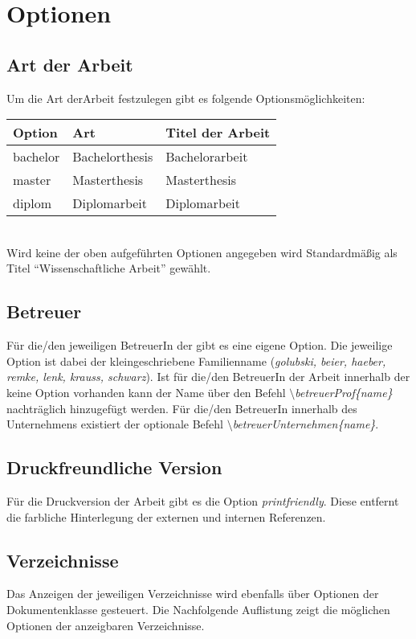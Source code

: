 \section{Optionen}
\label{sec:class_opts}

\subsection{Art der Arbeit}
Um die Art derArbeit festzulegen gibt es folgende Optionsmöglichkeiten:\\

\begin{tabular}{lll}
\bf Option&\bf Art&\bf Titel der Arbeit \\
\hline\hline
  bachelor			& Bachelorthesis & Bachelorarbeit   \\
  master			& Masterthesis   & Masterthesis     \\
  diplom			& Diplomarbeit	 & Diplomarbeit 	\\
\end{tabular}\\[5mm]

Wird keine der oben aufgeführten Optionen angegeben wird Standardmäßig als Titel "`Wissenschaftliche Arbeit"' gewählt.


\subsection{Betreuer}
Für die/den jeweiligen BetreuerIn der  gibt es eine eigene Option. Die jeweilige Option ist dabei der kleingeschriebene Familienname
(\textit{golubski, beier, haeber, remke, lenk, krauss, schwarz}). 
Ist für die/den BetreuerIn der Arbeit innerhalb der   keine Option vorhanden kann der Name über den Befehl \textit{$\setminus$betreuerProf\{name\}} nachträglich hinzugefügt werden. 
Für die/den BetreuerIn innerhalb des Unternehmens existiert der optionale Befehl \textit{$\setminus$betreuerUnternehmen\{name\}}.

\subsection{Druckfreundliche Version}
Für die Druckversion der Arbeit gibt es die Option \textit{printfriendly}. 
Diese entfernt die farbliche Hinterlegung der externen und internen Referenzen.

\subsection{Verzeichnisse}
Das Anzeigen der jeweiligen Verzeichnisse wird ebenfalls über Optionen der Dokumentenklasse gesteuert. 
Die Nachfolgende Auflistung zeigt die möglichen Optionen der anzeigbaren Verzeichnisse.\\

